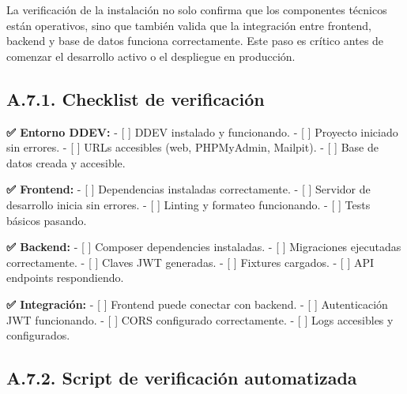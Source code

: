 \documentclass[12pt,a4paper,oneside]{report}
\begin{document}
La verificación de la instalación no solo confirma que los componentes
técnicos están operativos, sino que también valida que la integración
entre frontend, backend y base de datos funciona correctamente. Este
paso es crítico antes de comenzar el desarrollo activo o el despliegue
en producción.

\subsection{A.7.1. Checklist de
verificación}\label{a.7.1.-checklist-de-verificaciuxf3n}

\textbf{✅ Entorno DDEV:} - {[} {]} DDEV instalado y funcionando. - {[}
{]} Proyecto iniciado sin errores. - {[} {]} URLs accesibles (web,
PHPMyAdmin, Mailpit). - {[} {]} Base de datos creada y accesible.

\textbf{✅ Frontend:} - {[} {]} Dependencias instaladas correctamente. -
{[} {]} Servidor de desarrollo inicia sin errores. - {[} {]} Linting y
formateo funcionando. - {[} {]} Tests básicos pasando.

\textbf{✅ Backend:} - {[} {]} Composer dependencies instaladas. - {[}
{]} Migraciones ejecutadas correctamente. - {[} {]} Claves JWT
generadas. - {[} {]} Fixtures cargados. - {[} {]} API endpoints
respondiendo.

\textbf{✅ Integración:} - {[} {]} Frontend puede conectar con backend.
- {[} {]} Autenticación JWT funcionando. - {[} {]} CORS configurado
correctamente. - {[} {]} Logs accesibles y configurados.

\subsection{A.7.2. Script de verificación
automatizada}\label{a.7.2.-script-de-verificaciuxf3n-automatizada}
\end{document}
